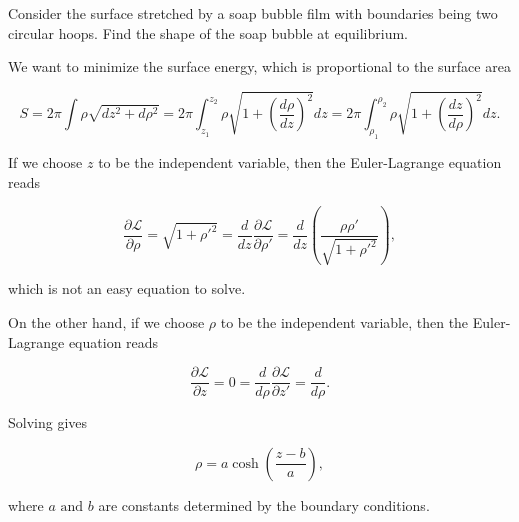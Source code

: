 \documentclass[a4paper,12pt]{report}
\begin{document}
{Consider the surface stretched by a soap bubble film with boundaries being two circular hoops. Find the shape of the soap bubble at equilibrium.}
{We want to minimize the surface energy, which is proportional to the surface area 

\begin{equation}
	S = 2\pi \int \rho \sqrt{dz^2+d\rho ^2} = 2\pi \int_{z_1 }^{z_2 } \rho \sqrt{1+\left( \frac{d\rho }{dz}  \right)^2} dz = 2\pi \int_{\rho _{1} }^{\rho _{2} } \rho \sqrt{1+\left( \frac{dz}{d\rho }  \right)^2} dz.      
\end{equation}

If we choose \(z\) to be the independent variable, then the Euler-Lagrange equation reads

\begin{equation}
	\frac{\partial \mathcal{L}}{\partial \rho } = \sqrt{1+\rho '^2}  = \frac{d}{dz} \frac{\partial \mathcal{L}}{\partial \rho ' } = \frac{d}{dz} \left( \frac{\rho \rho '}{\sqrt{1+\rho '^2} }  \right),
\end{equation}

which is not an easy equation to solve.

On the other hand, if we choose \(\rho \) to be the independent variable, then the Euler-Lagrange equation reads

\begin{equation}
	\frac{\partial \mathcal{L}}{\partial z} = 0 = \frac{d}{d\rho } \frac{\partial \mathcal{L}}{\partial z'} = \frac{d}{d\rho }. 
\end{equation}

Solving gives 

\begin{equation}
	\rho = a \cosh \left( \frac{z-b}{a}  \right),
\end{equation}

where \(a \text { and } b\) are constants determined by the boundary conditions. 
} 
\end{document}

